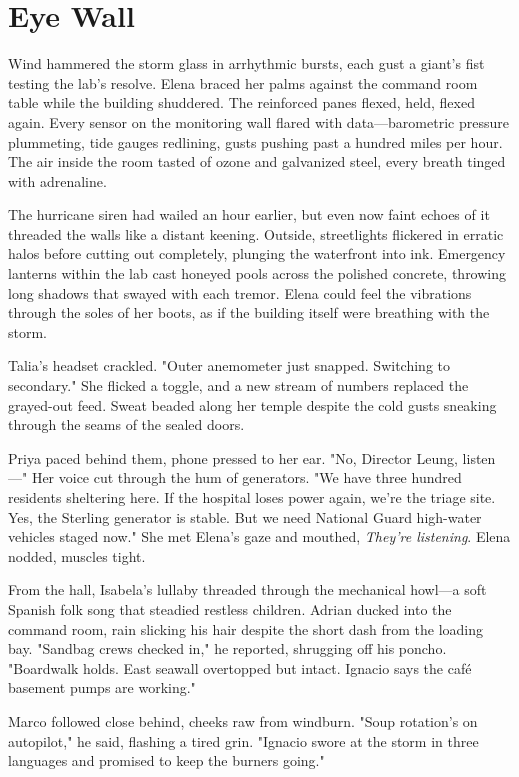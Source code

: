 \chapter{Eye Wall}

Wind hammered the storm glass in arrhythmic bursts, each gust a giant's fist testing the lab's resolve. Elena braced her palms against the command room table while the building shuddered. The reinforced panes flexed, held, flexed again. Every sensor on the monitoring wall flared with data—barometric pressure plummeting, tide gauges redlining, gusts pushing past a hundred miles per hour. The air inside the room tasted of ozone and galvanized steel, every breath tinged with adrenaline.

The hurricane siren had wailed an hour earlier, but even now faint echoes of it threaded the walls like a distant keening. Outside, streetlights flickered in erratic halos before cutting out completely, plunging the waterfront into ink. Emergency lanterns within the lab cast honeyed pools across the polished concrete, throwing long shadows that swayed with each tremor. Elena could feel the vibrations through the soles of her boots, as if the building itself were breathing with the storm.

Talia's headset crackled. "Outer anemometer just snapped. Switching to secondary." She flicked a toggle, and a new stream of numbers replaced the grayed-out feed. Sweat beaded along her temple despite the cold gusts sneaking through the seams of the sealed doors.

Priya paced behind them, phone pressed to her ear. "No, Director Leung, listen—" Her voice cut through the hum of generators. "We have three hundred residents sheltering here. If the hospital loses power again, we're the triage site. Yes, the Sterling generator is stable. But we need National Guard high-water vehicles staged now." She met Elena's gaze and mouthed, \textit{They're listening}. Elena nodded, muscles tight.

From the hall, Isabela's lullaby threaded through the mechanical howl—a soft Spanish folk song that steadied restless children. Adrian ducked into the command room, rain slicking his hair despite the short dash from the loading bay. "Sandbag crews checked in," he reported, shrugging off his poncho. "Boardwalk holds. East seawall overtopped but intact. Ignacio says the café basement pumps are working."

Marco followed close behind, cheeks raw from windburn. "Soup rotation's on autopilot," he said, flashing a tired grin. "Ignacio swore at the storm in three languages and promised to keep the burners going."

